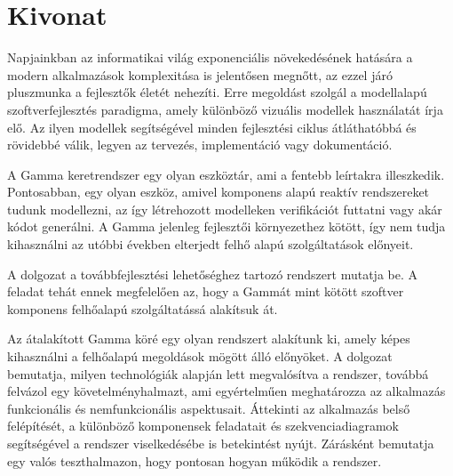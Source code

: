 \setcounter{page}{1}

\selecthungarian

\chapter*{Kivonat}
Napjainkban az informatikai világ exponenciális növekedésének hatására a modern alkalmazások komplexitása is jelentősen megnőtt, az ezzel járó pluszmunka a fejlesztők életét nehezíti. Erre megoldást szolgál a modellalapú szoftverfejlesztés paradigma, amely különböző vizuális modellek használatát írja elő. Az ilyen modellek segítségével minden fejlesztési ciklus átláthatóbbá és rövidebbé válik, legyen az tervezés, implementáció vagy dokumentáció.

A Gamma keretrendszer egy olyan eszköztár, ami a fentebb leírtakra illeszkedik. Pontosabban, egy olyan eszköz, amivel komponens alapú reaktív rendszereket tudunk modellezni, az így létrehozott modelleken verifikációt futtatni vagy akár kódot generálni. A Gamma jelenleg fejlesztői környezethez kötött, így nem tudja kihasználni az utóbbi években elterjedt felhő alapú szolgáltatások előnyeit.

A dolgozat a továbbfejlesztési lehetőséghez tartozó rendszert mutatja be. A feladat tehát ennek megfelelően az, hogy a Gammát mint kötött szoftver komponens felhőalapú szolgáltatássá alakítsuk át.

Az átalakított Gamma köré egy olyan rendszert alakítunk ki, amely képes kihasználni a felhőalapú megoldások mögött álló előnyöket. A dolgozat bemutatja, milyen technológiák alapján lett megvalósítva a rendszer, továbbá felvázol egy követelményhalmazt, ami egyértelműen meghatározza az alkalmazás funkcionális és nemfunkcionális aspektusait. Áttekinti az alkalmazás belső felépítését, a különböző komponensek feladatait és szekvenciadiagramok segítségével a rendszer viselkedésébe is betekintést nyújt. Zárásként bemutatja egy valós teszthalmazon, hogy pontosan hogyan működik a rendszer.
